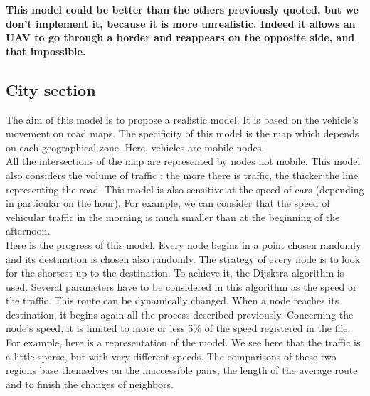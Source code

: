 \textbf{This model could be better than the others previously quoted, but we don't implement it, because it is more unrealistic. Indeed it allows an UAV to go through a border and reappears on the opposite side, and that impossible.}

\newpage

\subsection{City section}

The aim of this model is to propose a realistic model. It is based on the vehicle's movement on road maps. The specificity of this model is the map which depends on each geographical zone. Here, vehicles are mobile nodes.\\



All the intersections of the map are represented by nodes not mobile.
This model also considers the volume of traffic : the more there is traffic, the thicker the line representing the road.
This model is also sensitive at the speed of cars (depending in particular on the hour). For example, we can consider that the speed of vehicular traffic in the morning is much smaller than at the beginning of the afternoon.\\

Here is the progress of this model. Every node begins in a point chosen randomly and its destination is chosen also randomly. The strategy of every node is to look for the shortest up to the destination. To achieve it, the Dijsktra algorithm is used. Several parameters have to be considered in this algorithm as the speed or the traffic. This route can be dynamically changed. When a node reaches its destination, it begins again all the process described previously. Concerning the node's speed, it is limited to more or less 5\% of the speed registered in the file.\\
For example, here is a representation of the model. We see here that the traffic is a little sparse, but with very different speeds. The comparisons of these two regions base themselves on the inaccessible pairs, the length of the average route and to finish the changes of neighbors.\\

